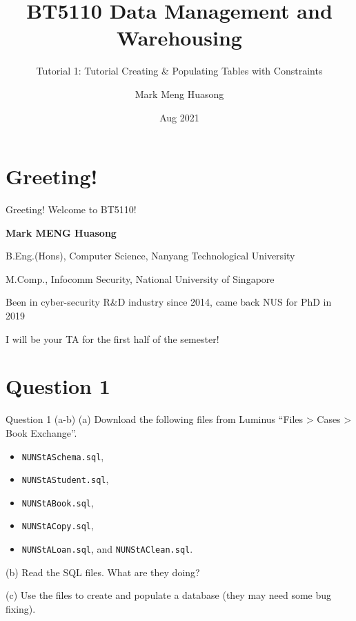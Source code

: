 \title{BT5110 Data Management and Warehousing}

\subtitle{Tutorial 1: Tutorial Creating \& Populating Tables with Constraints}

\author{Mark Meng Huasong}



\date{Aug 2021}

\begin{frame}
	\titlepage
\end{frame}

\section*{Greeting!}

\begin{frame}[fragile]{Greeting!}
Welcome to BT5110!\vspace{15pt}

\textbf{Mark MENG Huasong} \vspace{15pt}

B.Eng.(Hons), Computer Science, Nanyang Technological University

M.Comp., Infocomm Security, National University of Singapore\vspace{15pt}

Been in cyber-security R\&D industry since 2014, came back NUS for PhD in 2019\vspace{15pt}

I will be your TA for the first half of the semester!
\end{frame}

\section*{Question 1}

\begin{frame}[fragile]{Question 1 (a-b)}
(a) Download the following files from Luminus ``Files > Cases > Book Exchange''.
\begin{itemize}
	\item[] \texttt{NUNStASchema.sql},
	\item[] \texttt{NUNStAStudent.sql},
	\item[] \texttt{NUNStABook.sql},
	\item[] \texttt{NUNStACopy.sql},
	\item[] \texttt{NUNStALoan.sql}, and \texttt{NUNStAClean.sql}.
\end{itemize}
\vspace{10pt}

(b) Read the SQL files. What are they doing? \vspace{10pt}

(c) Use the files to create and populate a database (they may need some bug fixing).
\end{frame}

